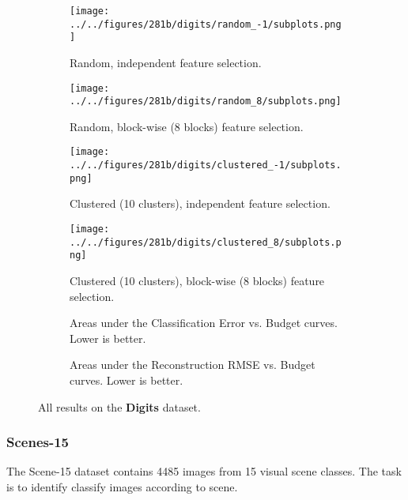 \begin{figure}[ht]
    \centering
    \begin{subfigure}[b]{.9\textwidth}
        \centering
        \texttt{[image: ../../figures/281b/digits/random\_-1/subplots.png]}
        \caption{Random, independent feature selection.\vspace{.2cm}}
    \end{subfigure}
    \begin{subfigure}[b]{.9\textwidth}
        \centering
        \texttt{[image: ../../figures/281b/digits/random\_8/subplots.png]}
        \caption{Random, block-wise (8 blocks) feature selection.\vspace{.2cm}}
    \end{subfigure}
    \begin{subfigure}[b]{\textwidth}
        \centering
        \texttt{[image: ../../figures/281b/digits/clustered\_-1/subplots.png]}
        \caption{Clustered (10 clusters), independent feature selection.\vspace{.2cm}}
    \end{subfigure}
    \begin{subfigure}[b]{\textwidth}
        \centering
        \texttt{[image: ../../figures/281b/digits/clustered\_8/subplots.png]}
        \caption{Clustered (10 clusters), block-wise (8 blocks) feature selection.\vspace{.2cm}}
    \end{subfigure}

    \begin{subfigure}[t]{.48\textwidth}
        \centering
        \tiny{}
        \caption{Areas under the Classification Error vs. Budget curves. Lower is better.}
    \end{subfigure}\hfill%
    \begin{subfigure}[t]{.48\textwidth}
        \centering
        \tiny{}
        \caption{Areas under the Reconstruction RMSE vs. Budget curves. Lower is better.}
    \end{subfigure}
    \caption{All results on the \textbf{Digits} dataset.}
    \label{fig:digits}
\end{figure}

\subsubsection{Scenes-15}
The Scene-15 dataset \cite{Lazebnik-CVPR-2006} contains 4485 images from 15 visual scene classes.
The task is to identify classify images according to scene.

